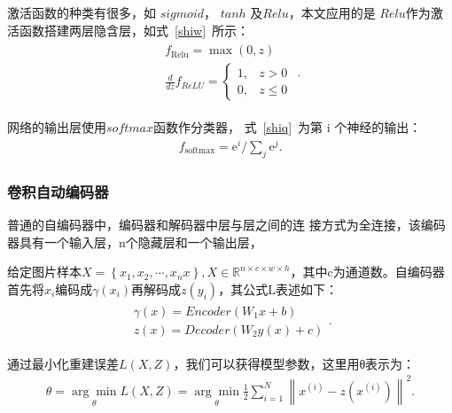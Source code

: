 \documentclass{whutmod}
\begin{document}
	激活函数的种类有很多，如 $sigmoid$， $tanh$ 及$ Relu$，本文应用的是 $Relu$作为激活函数搭建两层隐含层，如式~\ref{shiw}~所示：
	\begin{gather}\label{shiw}
	\begin{array}{c}{f_{\text {Relu}}=\max (0, z)}\\
	\displaystyle \frac{d}{d z} f_{R e L U}=\left\{\begin{array}{ll}{1,} & {z>0} \\ {0,} & {z \leqslant 0}\end{array}\right.
	\end{array}.
	\end{gather}
	
	网络的输出层使用$ softmax $函数作分类器， 式~\ref{shiq}~为第 i 个神经的输出：
	\begin{gather*}\label{shiq}
	f_{\text {softmax}}=\mathrm{e}^{i} / \sum_{j} \mathrm{e}^{j}.
	\end{gather*}
	
			\subsubsection{卷积自动编码器}
			普通的自编码器中，编码器和解码器中层与层之间的连
			接方式为全连接，该编码器具有一个输入层，n个隐藏层和一个输出层，
			
			给定图片样本$X=\left\{ x_1,x_2,\cdots,x_nx \right\}, X\in \mathbb{R}^{n\times c\times w \times h}$，其中c为通道数。自编码器首先将$x_i$编码成$\gamma(x_i)$再解码成$z(y_i)$，其公式L表述如下：
				\begin{gather}
			\begin{array}{l}
			\gamma (x)=Encoder\left(W_{1} x+b\right) \\
			z(x)=Decoder\left(W_{2} y(x)+c\right)
			\end{array}.
			\end{gather}
			
			通过最小化重建误差$L(X,Z)$，我们可以获得模型参数，这里用θ表示为：
			\begin{gather}
			\theta=\underset{\theta}{\arg \min } L(X, Z)=\underset{\theta}{\arg \min } \frac{1}{2} \sum_{i=1}^{N}\left\|x^{(i)}-z\left(x^{(i)}\right)\right\|^{2}.
			\end{gather}
\end{document}
